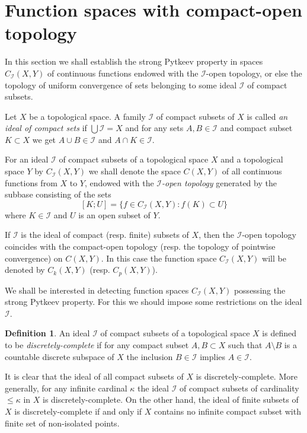 \documentclass{amsart}
\theoremstyle{definition}
\newtheorem{definition}[theorem]{Definition}
\begin{document}
\section{Function spaces with compact-open topology}\label{s2}

In this section we shall establish the strong Pytkeev property in spaces $C_{\mathcal I}(X,Y)$ of continuous functions endowed with the ${\mathcal I}$-open topology, or else the topology of uniform convergence of sets belonging to some ideal ${\mathcal I}$ of compact subsets.

Let $X$ be a topological space. A family ${\mathcal I}$ of compact subsets of $X$ is called {\em an ideal of compact sets} if $\bigcup{\mathcal I}=X$ and for any sets $A,B\in{\mathcal I}$ and compact subset $K\subset X$ we get $A\cup B\in{\mathcal I}$ and $A\cap K\in{\mathcal I}$.

For an ideal ${\mathcal I}$ of compact subsets of a topological space $X$ and a topological space $Y$ by $C_{\mathcal I}(X,Y)$ we shall denote the space $C(X,Y)$ of all continuous functions from $X$ to $Y$, endowed with the {\em ${\mathcal I}$-open topology} generated by the subbase consisting of the sets
$$[K;U]=\{f\in C_{\mathcal I}(X,Y):f(K)\subset U\}$$where $K\in{\mathcal I}$ and $U$ is an open subset of $Y$.

If ${\mathcal I}$ is the ideal of compact (resp. finite) subsets of $X$, then the ${\mathcal I}$-open topology coincides with the compact-open topology (resp. the topology of pointwise convergence) on $C(X,Y)$. In this case the function space $C_{\mathcal I}(X,Y)$ will be denoted by $C_k(X,Y)$ (resp. $C_p(X,Y)$).

We shall be interested in detecting function spaces $C_{\mathcal I}(X,Y)$ possessing the strong Pytkeev property. For this we should impose some restrictions on the ideal ${\mathcal I}$.

\begin{definition} An ideal ${\mathcal I}$ of compact subsets of a topological space $X$ is defined to be {\em discretely-complete} if for any compact subset $A,B\subset X$ such that $A\setminus B$ is a countable discrete subspace of $X$ the inclusion $B\in{\mathcal I}$ implies $A\in{\mathcal I}$.
\end{definition}

It is clear that the ideal of all compact subsets of $X$ is discretely-complete. More generally, for any infinite cardinal $\kappa$ the ideal ${\mathcal I}$ of compact subsets of cardinality $\le\kappa$ in  $X$ is discretely-complete. On the other hand, the ideal of finite subsets of $X$ is discretely-complete if and only if $X$ contains no infinite compact subset with finite set of non-isolated points.
\end{document}
